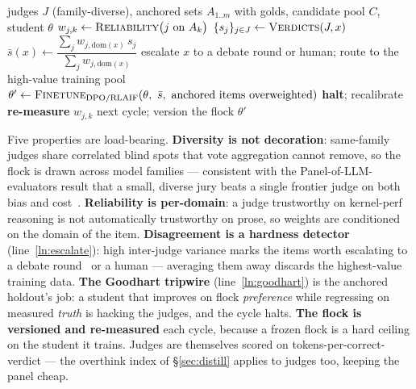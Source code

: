 \documentclass[11pt]{article}
\begin{document}
\begin{algorithm}[h]
\caption{\textsc{CalibratedJudgeFlock} --- anchored, diverse, disagreement-aware judging}
\label{alg:flock}
\begin{algorithmic}[1]
\Require judges $J$ (family-diverse), anchored sets $A_{1..m}$ with golds, candidate pool $C$, student $\theta$
 
  \State $w_{j,k} \gets \textsc{Reliability}\bigl(j \text{ on } A_k\bigr)$ 
\EndFor
{}
  \State $\{s_{j}\}_{j\in J} \gets \textsc{Verdicts}(J, x)$
  \State $\bar s(x) \gets \dfrac{\sum_j w_{j,\mathrm{dom}(x)}\, s_j}{\sum_j w_{j,\mathrm{dom}(x)}}$ 
   
     \State escalate $x$ to a debate round or human; route to the high-value training pool \label{ln:escalate}
  \EndIf
\EndFor
\State $\theta' \gets \textsc{Finetune}_{\mathrm{DPO/RLAIF}}(\theta,\ \bar s,\ \text{anchored items overweighted})$ 
  \State \textbf{halt}; recalibrate  \label{ln:goodhart}
\EndIf
\State \textbf{re-measure} $w_{j,k}$ next cycle; version the flock 
\State \Return $\theta'$
\end{algorithmic}
\end{algorithm}

Five properties are load-bearing. \textbf{Diversity is not decoration}: same-family judges share correlated
blind spots that vote aggregation cannot remove, so the flock is drawn across model families --- consistent
with the Panel-of-LLM-evaluators result that a small, diverse jury beats a single frontier judge on both bias
and cost~\cite{poll}. \textbf{Reliability is per-domain}: a judge trustworthy on kernel-perf reasoning is not
automatically trustworthy on prose, so weights are conditioned on the domain of the item. \textbf{Disagreement
is a hardness detector} (line~\ref{ln:escalate}): high inter-judge variance marks the items worth escalating
to a debate round~\cite{debate} or a human --- averaging them away discards the highest-value training data.
\textbf{The Goodhart tripwire} (line~\ref{ln:goodhart}) is the anchored holdout's job: a student that improves
on flock \emph{preference} while regressing on measured \emph{truth} is hacking the judges, and the cycle
halts. \textbf{The flock is versioned and re-measured} each cycle, because a frozen flock is a hard ceiling on
the student it trains. Judges are themselves scored on tokens-per-correct-verdict --- the overthink index of
\S\ref{sec:distill} applies to judges too, keeping the panel cheap.
\end{document}
